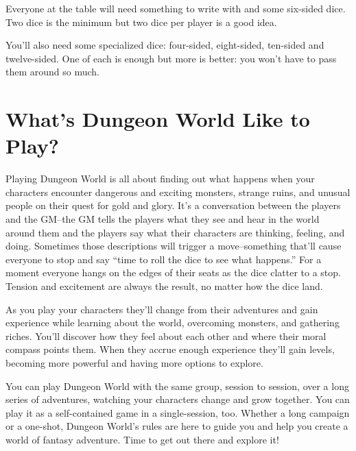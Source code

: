  Everyone at the table will need something to write with and some six-sided dice. Two dice is the minimum but two dice per player is a good idea.


 You'll also need some specialized dice: four-sided, eight-sided, ten-sided and twelve-sided. One of each is enough but more is better: you won't have to pass them around so much.
\section{What's Dungeon World Like to Play?}


 Playing Dungeon World is all about finding out what happens when your characters encounter dangerous and exciting monsters, strange ruins, and unusual people on their quest for gold and glory. It's a conversation between the players and the GM--the GM tells the players what they see and hear in the world around them and the players say what their characters are thinking, feeling, and doing. Sometimes those descriptions will trigger a move--something that'll cause everyone to stop and say ``time to roll the dice to see what happens.'' For a moment everyone hangs on the edges of their seats as the dice clatter to a stop. Tension and excitement are always the result, no matter how the dice land.


 As you play your characters they'll change from their adventures and gain experience while learning about the world, overcoming monsters, and gathering riches. You'll discover how they feel about each other and where their moral compass points them. When they accrue enough experience they'll gain levels, becoming more powerful and having more options to explore.


 You can play Dungeon World with the same group, session to session, over a long series of adventures, watching your characters change and grow together. You can play it as a self-contained game in a single-session, too. Whether a long campaign or a one-shot, Dungeon World's rules are here to guide you and help you create a world of fantasy adventure. Time to get out there and explore it!

